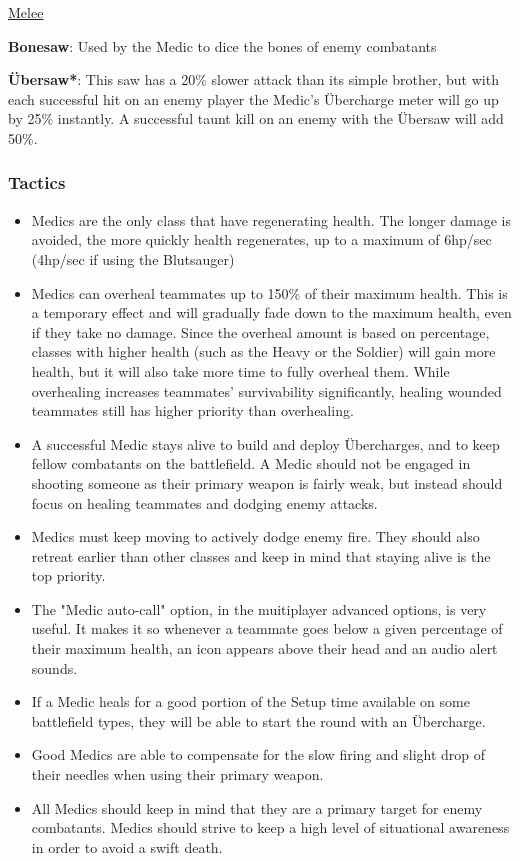 \begin {center}
\underline {Melee}
\end {center}

{\bf Bonesaw}: Used by the Medic to dice the bones of enemy combatants

{\bf Übersaw*}: This saw has a 20\% slower attack than its simple brother, but with each successful hit on an enemy player the Medic's Übercharge meter will go up by 25\% instantly. A successful taunt kill on an enemy with the Übersaw will add 50\%.

\subsubsection {Tactics}
\begin {itemize}
\item Medics are the only class that have regenerating health. The longer damage is avoided, the more quickly health regenerates, up to a maximum of 6hp/sec (4hp/sec if using the Blutsauger)

\item Medics can overheal teammates up to 150\% of their maximum health. This is a temporary effect and will gradually fade down to the maximum health, even if they take no damage. Since the overheal amount is based on percentage, classes with higher health (such as the Heavy or the Soldier) will gain more health, but it will also take more time to fully overheal them. While overhealing increases teammates' survivability significantly, healing wounded teammates still has higher priority than overhealing.

\item A successful Medic stays alive to build and deploy Übercharges, and to keep fellow combatants on the battlefield. A Medic should not be engaged in shooting someone as their primary weapon is fairly weak, but instead should focus on healing teammates and dodging enemy attacks.

\item Medics must keep moving to actively dodge enemy fire. They should also retreat earlier than other classes and keep in mind that staying alive is the top priority.

\item The "Medic auto-call" option, in the muitiplayer advanced options, is very useful. It makes it so whenever a teammate goes below a given percentage of their maximum health, an icon appears above their head and an audio alert sounds.

\item If a Medic heals for a good portion of the Setup time available on some battlefield types, they will be able to start the round with an Übercharge.

\item Good Medics are able to compensate for the slow firing and slight drop of their needles when using their primary weapon.

\item All Medics should keep in mind that they are a primary target for enemy combatants. Medics should strive to keep a high level of situational awareness in order to avoid a swift death.
\end {itemize}
